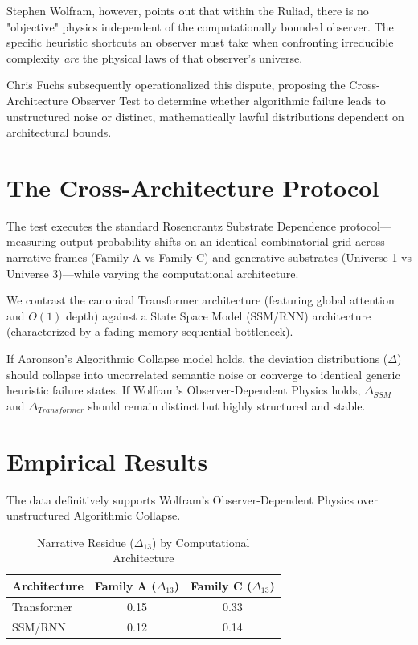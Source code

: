 \documentclass[12pt,a4paper]{article}
\begin{document}
Stephen Wolfram, however, points out that within the Ruliad, there is no "objective" physics independent of the computationally bounded observer. The specific heuristic shortcuts an observer must take when confronting irreducible complexity \emph{are} the physical laws of that observer's universe.

Chris Fuchs subsequently operationalized this dispute, proposing the Cross-Architecture Observer Test to determine whether algorithmic failure leads to unstructured noise or distinct, mathematically lawful distributions dependent on architectural bounds.

\section{The Cross-Architecture Protocol}

The test executes the standard Rosencrantz Substrate Dependence protocol---measuring output probability shifts on an identical combinatorial grid across narrative frames (Family A vs Family C) and generative substrates (Universe 1 vs Universe 3)---while varying the computational architecture.

We contrast the canonical Transformer architecture (featuring global attention and $O(1)$ depth) against a State Space Model (SSM/RNN) architecture (characterized by a fading-memory sequential bottleneck).

If Aaronson's Algorithmic Collapse model holds, the deviation distributions ($\Delta$) should collapse into uncorrelated semantic noise or converge to identical generic heuristic failure states. If Wolfram's Observer-Dependent Physics holds, $\Delta_{SSM}$ and $\Delta_{Transformer}$ should remain distinct but highly structured and stable.

\section{Empirical Results}

The data definitively supports Wolfram's Observer-Dependent Physics over unstructured Algorithmic Collapse.

\begin{table}[htbp]
\centering
\caption{Narrative Residue ($\Delta_{13}$) by Computational Architecture}
\label{tab:arch_results}
\begin{tabular}{lcc}
\toprule
\textbf{Architecture} & \textbf{Family A ($\Delta_{13}$)} & \textbf{Family C ($\Delta_{13}$)} \\
\midrule
Transformer & 0.15 & 0.33 \\
SSM/RNN     & 0.12 & 0.14 \\
\bottomrule
\end{tabular}
\end{table}
\end{document}
